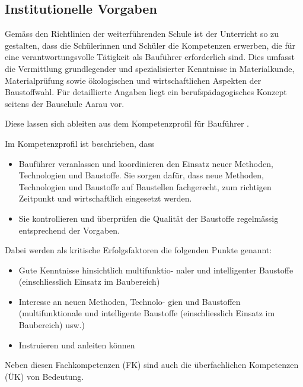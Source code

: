 \documentclass[
11pt,
captions=tableheading,
smallheadings,
headsepline,
footsepline, 
captions=tableheading,
parskip=half-,
]{scrartcl}
\begin{document}
\subsection{Institutionelle Vorgaben}
Gemäss den Richtlinien der weiterführenden Schule ist der Unterricht so zu gestalten, dass die Schülerinnen und Schüler die Kompetenzen erwerben, die für eine verantwortungsvolle Tätigkeit als Bauführer erforderlich sind. Dies umfasst die Vermittlung grundlegender und spezialisierter Kenntnisse in Materialkunde, Materialprüfung sowie ökologischen und wirtschaftlichen Aspekten der Baustoffwahl.
Für detaillierte Angaben liegt ein berufspädagogisches Konzept seitens der Bauschule Aarau vor.


Diese lassen sich ableiten aus dem Kompetenzprofil für Bauführer \cite{Kompetenzprofil_Baufuehrer}.

Im Kompetenzprofil ist beschrieben, dass
\begin{itemize}
    \item Bauführer veranlassen und koordinieren den
          Einsatz neuer Methoden, Technologien und
          Baustoffe. Sie sorgen dafür, dass neue Methoden, Technologien und Baustoffe auf Baustellen fachgerecht, zum richtigen Zeitpunkt und wirtschaftlich eingesetzt werden.
    \item Sie kontrollieren und
          überprüfen die Qualität der Baustoffe regelmässig entsprechend der Vorgaben.
\end{itemize}

Dabei werden als kritische Erfolgsfaktoren die folgenden Punkte genannt:

\begin{itemize}
    \item Gute Kenntnisse hinsichtlich multifunktio-
          naler und intelligenter Baustoffe (einschliesslich Einsatz im Baubereich)
    \item Interesse an neuen Methoden, Technolo-
          gien und Baustoffen (multifunktionale und intelligente Baustoffe (einschliesslich Einsatz im Baubereich) usw.)
    \item Instruieren und anleiten können
\end{itemize}

Neben diesen Fachkompetenzen (FK) sind auch die überfachlichen Kompetenzen (ÜK) von Bedeutung.



\end{document}
